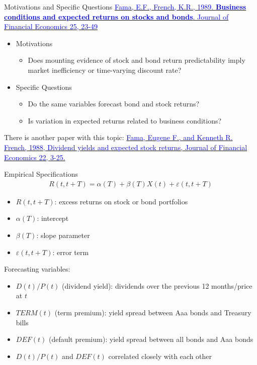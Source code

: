 \documentclass{beamer}
\begin{document}
\begin{frame}{Motivations and Specific Questions}
	\href{https://doi.org/10.1016/0304-405X(89)90095-0}{\textcolor{blue}{Fama, E.F., French, K.R., 1989. \textbf{Business conditions and expected returns on stocks and bonds}. Journal of Financial Economics 25, 23-49}}
	\begin{itemize}
		\item Motivations
		\begin{itemize}
			\item Does mounting evidence of stock and bond return predictability imply
			market inefficiency or time-varying discount rate?
		\end{itemize}
		\item Specific Questions
		\begin{itemize}
			\item Do the same variables forecast bond and stock returns?
			\item Is variation in expected returns related to business conditions?
		\end{itemize}
	\end{itemize}

There is another paper with this topic: \href{https://doi.org/10.1016/0304-405X(88)90020-7}{\textcolor{blue}{Fama, Eugene F., and Kenneth R. French, 1988, Dividend yields and expected stock returns, Journal of Financial Economics 22, 3-25.}}
\end{frame}

\begin{frame}{Empirical Specifications}
	\begin{align*}
		R(t, t+T)=\alpha(T)+\beta(T) X(t)+\varepsilon(t, t+T)
	\end{align*}
\begin{itemize}
	\item $ R(t, t+T) $: excess returns on stock or bond portfolios
	\item $ \alpha(T) $: intercept
	\item $ \beta(T) $: slope parameter
	\item $ \varepsilon(t, t+T) $: error term
\end{itemize}

\end{frame}

\begin{frame}
	Forecasting variables:
	\begin{itemize}
		\item $D(t)/P(t)$ (dividend yield): dividends over the previous 12 months/price at $ t $
		\item $TERM(t)$ (term premium): yield spread between Aaa bonds and Treasury bills
		\item $DEF(t)$ (default premium): yield spread between all bonds and Aaa bonds 
		\item $D(t)/P(t)$ and $DEF(t)$ correlated closely with each other
	\end{itemize}
\end{frame}
\end{document}
